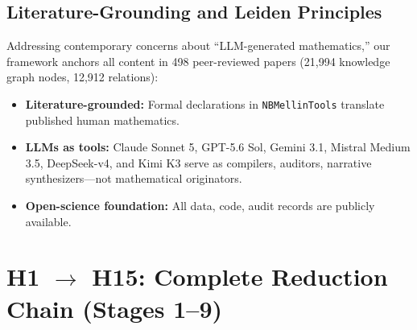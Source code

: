 \documentclass[11pt,a4paper]{article}
\theoremstyle{plain}
\theoremstyle{definition}
\theoremstyle{remark}
\begin{document}
\subsection{Literature-Grounding and Leiden Principles}

Addressing contemporary concerns about ``LLM-generated mathematics,'' our framework anchors all content in 498 peer-reviewed papers (21,994 knowledge graph nodes, 12,912 relations):

\begin{itemize}[leftmargin=2em]
  \item \textbf{Literature-grounded:} Formal declarations in \texttt{NBMellinTools} translate published human mathematics.
  \item \textbf{LLMs as tools:} Claude Sonnet 5, GPT-5.6 Sol, Gemini 3.1, Mistral Medium 3.5, DeepSeek-v4, and Kimi K3 serve as compilers, auditors, narrative synthesizers---not mathematical originators.
  \item \textbf{Open-science foundation:} All data, code, audit records are publicly available.
\end{itemize}

\section{H1 $\to$ H15: Complete Reduction Chain (Stages 1--9)}
\label{sec:reduction_chain}
\end{document}
